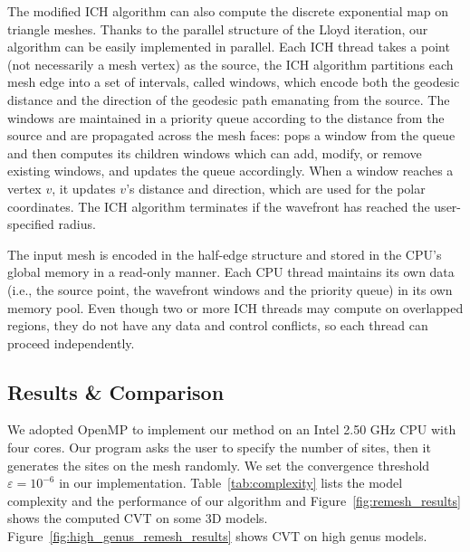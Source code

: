 The modified ICH algorithm can also compute the discrete exponential map on triangle meshes.
Thanks to the parallel structure of the Lloyd iteration, our algorithm can be easily implemented in parallel.
Each ICH thread takes a point (not necessarily a mesh vertex) as the source, the ICH algorithm partitions each mesh edge into a set of intervals, called windows, which encode both the geodesic distance and the direction of the geodesic path emanating from the source.
The windows are maintained in a priority queue according to the distance
from the source and are propagated across
the mesh faces: pops a window from the queue and then
computes its children windows which can add, modify, or
remove existing windows, and updates the queue accordingly.
When a window reaches a vertex $v$, it updates $v$'s distance and direction, which are used for the polar coordinates.
The ICH algorithm terminates if the wavefront has reached the user-specified radius.

The input mesh is encoded in the half-edge structure and stored in the CPU's
global memory in a read-only manner. Each CPU thread
maintains its own data (i.e., the source point, the wavefront
windows and the priority queue) in its own memory
pool. Even though two or more ICH threads may compute on overlapped regions, they do not have any data and control conflicts, so each thread can proceed independently.

\subsection{Results \& Comparison}\label{subsec:results}

We adopted OpenMP to implement our method on an Intel 2.50 GHz CPU
with four cores. Our program asks the user to specify the number of
sites, then it generates the sites on the mesh randomly. We set the
convergence threshold $\varepsilon=10^{-6}$ in our implementation.
Table~\ref{tab:complexity} lists the model complexity and the
performance of our algorithm and Figure~\ref{fig:remesh_results}
shows the computed CVT on some 3D models.
Figure~\ref{fig:high_genus_remesh_results} shows CVT on high genus
models.

